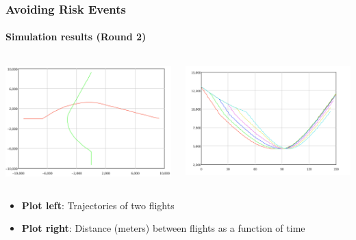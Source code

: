 \documentclass[UKenglish]{beamer}
\begin{document}
\begin{frame}
\frametitle{Avoiding Risk Events}
\framesubtitle{Simulation results (Round 2)}
\begin{columns}[T]
\begin{column}{0.5\textwidth}
\centering
\includegraphics[width=\textwidth]{MathDept-images/Rotation_trajc.png}
\end{column}
\begin{column}{0.53\textwidth}
\centering
\includegraphics[width=\textwidth]{MathDept-images/flight_dist.png}
\end{column}
\end{columns}
\begin{itemize}
    \item \textbf{Plot left}: Trajectories of two flights 
    \item \textbf{Plot right}: Distance (meters) between flights as a function of time
\end{itemize}
\end{frame}
\end{document}
